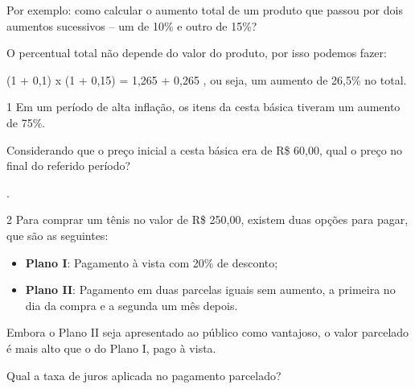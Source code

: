 {{{Por exemplo: como calcular o aumento total de um produto que 
passou por dois aumentos sucessivos -- um de 10\% e outro de 15\%?

O percentual total não depende do valor do produto, por isso podemos
fazer:

(1 + 0,1) x (1 + 0,15) = 1,265  + 0,265 , ou seja, um aumento 
de 26,5\% no total.
}


\num{1} Em um período de alta inflação, os itens da cesta básica tiveram
um aumento de 75\%.

Considerando que o preço inicial a cesta básica era de R\$ 60,00, qual
o preço no final do referido período?

.

\num{2} Para comprar um tênis no valor de R\$ 250,00, existem duas opções
para pagar, que são as seguintes:

\begin{itemize}
  \item \textbf{Plano I}: Pagamento à vista com 20\% de desconto;

  \item \textbf{Plano II}: Pagamento em duas parcelas iguais sem aumento, a primeira no dia da compra e a segunda um mês depois.
\end{itemize}

Embora o Plano II seja apresentado ao público como vantajoso, o valor
parcelado é mais alto que o do Plano I, pago à vista.

Qual a taxa de juros aplicada no pagamento parcelado?


}}

